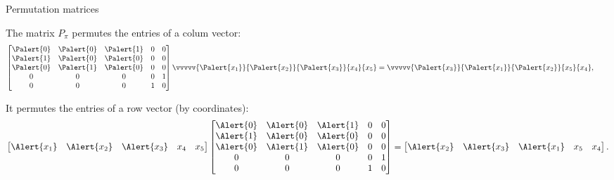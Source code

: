 \documentclass[8pt, handout]{beamer}
\newcommand{\Pause}{}
\begin{document}
\begin{frame}{Permutation matrices}
  \vspace{-2mm}\Pause
  
  The matrix $P_\pi$ permutes the entries of a colum vector:
  \[
  \begin{bmatrix} \Palert{0}&\Palert{0}&\Palert{1}&0&0 \\
    \Palert{1}&\Palert{0}&\Palert{0}&0&0 \\ \Palert{0}&\Palert{1}&\Palert{0}&0&0 \\ 0&0&0&0&1 \\ 0&0&0&1&0 \\
  \end{bmatrix}\vvvvv{\Palert{x_1}}{\Palert{x_2}}{\Palert{x_3}}{x_4}{x_5}=
  \vvvvv{\Palert{x_3}}{\Palert{x_1}}{\Palert{x_2}}{x_5}{x_4},\qquad
  \]

  \Pause
  
  It permutes the entries of a row vector (by coordinates):
  \[
  \begin{bmatrix} \Alert{x_1} & \Alert{x_2} & \Alert{x_3} & x_4 & x_5\end{bmatrix}
    \begin{bmatrix} \Alert{0}&\Alert{0}&\Alert{1}&0&0 \\
      \Alert{1}&\Alert{0}&\Alert{0}&0&0 \\
      \Alert{0}&\Alert{1}&\Alert{0}&0&0 \\ 0&0&0&0&1 \\ 0&0&0&1&0 \\
    \end{bmatrix}
    =\begin{bmatrix} \Alert{x_2} & \Alert{x_3} & \Alert{x_1} & x_5 & x_4\end{bmatrix}.
    \]

\end{frame}  

\end{document}
